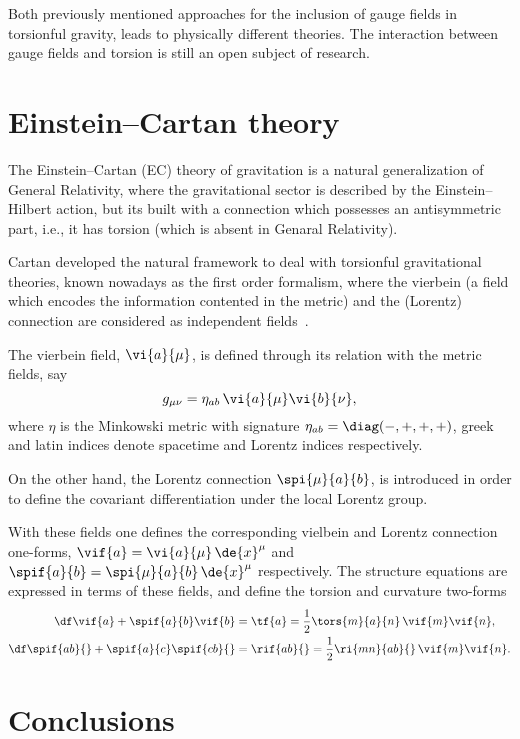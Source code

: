 Both previously mentioned approaches for the inclusion
of gauge fields in torsionful gravity, leads to physically
different theories. The interaction between gauge
fields and torsion is still an open subject of research.

\section{Einstein--Cartan theory\label{sec:EC}}

The Einstein--Cartan (EC) theory of gravitation is
a natural generalization of General Relativity,
where the gravitational sector is described by the
Einstein--Hilbert action, but its built with a
connection which possesses an antisymmetric part,
i.e., it has torsion (which is absent in Genaral
Relativity).

Cartan developed the natural framework to deal with
torsionful gravitational theories, known nowadays as
the first order formalism, where the vierbein (a field
which encodes the information contented in the metric) and
the (Lorentz) connection are considered as independent
fields~\cite{Cartan1922,Cartan1923,Cartan1924,Cartan1925}.

The vierbein field, $\vi{a}{\mu}$, is defined through
its relation with the metric fields, say
\begin{equation}
  g_{\mu\nu} = \eta_{a b} \, \vi{a}{\mu} \vi{b}{\nu},
\end{equation}
where $\eta$ is the Minkowski metric with signature
\mbox{$\eta_{a b} = \diag(-,+,+,+)$,} greek and latin indices
denote spacetime and Lorentz indices respectively.

On the other hand, the Lorentz connection $\spi{\mu}{a}{b}$,
is introduced in order to define the covariant differentiation
under the local Lorentz group.

With these fields one defines the corresponding vielbein
and Lorentz connection one-forms, \mbox{$\vif{a} = \vi{a}{\mu}
  \, \de{x}^\mu$} and \mbox{$\spif{a}{b} = \spi{\mu}{a}{b}
  \, \de{x}^\mu$} respectively. The structure equations
are expressed in terms of these fields, and define the
torsion and curvature two-forms
\begin{align}
  \df \vif{a} + \spif{a}{b} \vif{b} &= \tf{a} = \frac{1}{2} \tors{m}{a}{n} \, \vif{m} \vif{n},
  \label{strI} \\
  \df \spif{ab}{} + \spif{a}{c} \spif{c b}{} &= \rif{a b}{} = \frac{1}{2} \ri{m n}{a b}{} \, \vif{m} \vif{n}.
  \label{strII}
\end{align}


\section{Conclusions\label{conclusions}}


